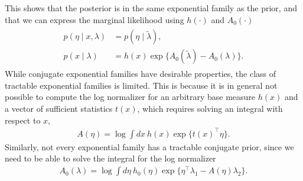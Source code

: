 \documentclass{article}
\begin{document}
This shows that the posterior is in the same exponential family as the prior, and that we can express the marginal likelihood using $h(\cdot)$ and $A_0(\cdot)$
\begin{align}
    \label{eq:cef-posterior-and-marginal}
    \begin{split}
    p(\eta \mid x, \lambda) &= p(\eta \mid \tilde{\lambda}),
    \\
    p(x \mid \lambda) &= h(x)\exp\big\{ A_0(\tilde{\lambda}) - A_0(\lambda) \big\}.
    \end{split}
\end{align}
While conjugate exponential families have desirable properties, the class of tractable exponential families is limited. This is because it is in general not possible to compute the log normalizer for an arbitrary base measure $h(x)$ and a vector of sufficient statistics $t(x)$, which requires solving an integral with respect to $x$,
\begin{align}
    A(\eta) = \log \int dx \: h(x) \exp \big\{ t(x)^\top \eta  \}.
\end{align}
Similarly, not every exponential family has a tractable conjugate prior, since we need to be able to solve the integral for the log normalizer 
\begin{align}
    A_0(\lambda) = \log \int d\eta \: h_0(\eta) \exp \big\{ \eta^\top\lambda_1 - A(\eta)\lambda_2 \big\}.
\end{align}


%
%



\end{document}
